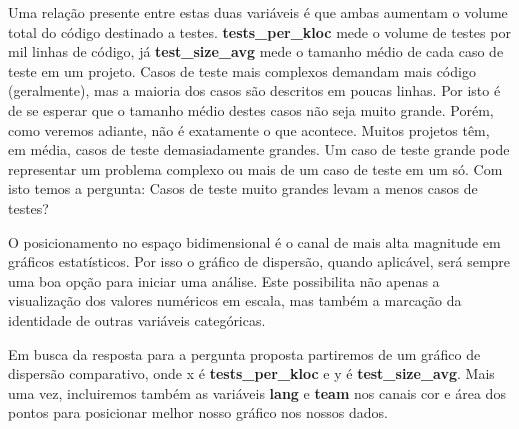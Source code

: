 \documentclass[]{article}
\newenvironment{Shaded}{\begin{snugshade}}{\end{snugshade}}
\newcommand{\KeywordTok}[1]{\textcolor[rgb]{0.13,0.29,0.53}{\textbf{#1}}}
\newcommand{\DataTypeTok}[1]{\textcolor[rgb]{0.13,0.29,0.53}{#1}}
\newcommand{\DecValTok}[1]{\textcolor[rgb]{0.00,0.00,0.81}{#1}}
\newcommand{\StringTok}[1]{\textcolor[rgb]{0.31,0.60,0.02}{#1}}
\newcommand{\OperatorTok}[1]{\textcolor[rgb]{0.81,0.36,0.00}{\textbf{#1}}}
\newcommand{\NormalTok}[1]{#1}
\begin{document}
Uma relação presente entre estas duas variáveis é que ambas aumentam o
volume total do código destinado a testes. \textbf{tests\_per\_kloc}
mede o volume de testes por mil linhas de código, já
\textbf{test\_size\_avg} mede o tamanho médio de cada caso de teste em
um projeto. Casos de teste mais complexos demandam mais código
(geralmente), mas a maioria dos casos são descritos em poucas linhas.
Por isto é de se esperar que o tamanho médio destes casos não seja muito
grande. Porém, como veremos adiante, não é exatamente o que acontece.
Muitos projetos têm, em média, casos de teste demasiadamente grandes. Um
caso de teste grande pode representar um problema complexo ou mais de um
caso de teste em um só. Com isto temos a pergunta: Casos de teste muito
grandes levam a menos casos de testes?

O posicionamento no espaço bidimensional é o canal de mais alta
magnitude em gráficos estatísticos. Por isso o gráfico de dispersão,
quando aplicável, será sempre uma boa opção para iniciar uma análise.
Este possibilita não apenas a visualização dos valores numéricos em
escala, mas também a marcação da identidade de outras variáveis
categóricas.

Em busca da resposta para a pergunta proposta partiremos de um gráfico
de dispersão comparativo, onde x é \textbf{tests\_per\_kloc} e y é
\textbf{test\_size\_avg}. Mais uma vez, incluiremos também as variáveis
\textbf{lang} e \textbf{team} nos canais cor e área dos pontos para
posicionar melhor nosso gráfico nos nossos dados.

\begin{Shaded}
\end{Shaded}
\end{document}
